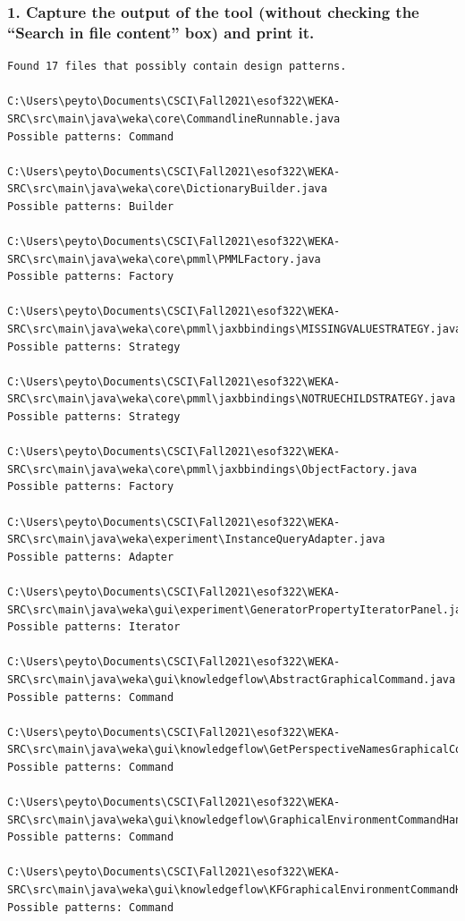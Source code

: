 \documentclass[12pt]{article}
\begin{document}
\subsubsection*{1. Capture the output of the tool (without checking the “Search in file content” box) and print it.}
\begin{lstlisting}
Found 17 files that possibly contain design patterns.

C:\Users\peyto\Documents\CSCI\Fall2021\esof322\WEKA-SRC\src\main\java\weka\core\CommandlineRunnable.java
Possible patterns: Command

C:\Users\peyto\Documents\CSCI\Fall2021\esof322\WEKA-SRC\src\main\java\weka\core\DictionaryBuilder.java
Possible patterns: Builder

C:\Users\peyto\Documents\CSCI\Fall2021\esof322\WEKA-SRC\src\main\java\weka\core\pmml\PMMLFactory.java
Possible patterns: Factory

C:\Users\peyto\Documents\CSCI\Fall2021\esof322\WEKA-SRC\src\main\java\weka\core\pmml\jaxbbindings\MISSINGVALUESTRATEGY.java
Possible patterns: Strategy

C:\Users\peyto\Documents\CSCI\Fall2021\esof322\WEKA-SRC\src\main\java\weka\core\pmml\jaxbbindings\NOTRUECHILDSTRATEGY.java
Possible patterns: Strategy

C:\Users\peyto\Documents\CSCI\Fall2021\esof322\WEKA-SRC\src\main\java\weka\core\pmml\jaxbbindings\ObjectFactory.java
Possible patterns: Factory

C:\Users\peyto\Documents\CSCI\Fall2021\esof322\WEKA-SRC\src\main\java\weka\experiment\InstanceQueryAdapter.java
Possible patterns: Adapter

C:\Users\peyto\Documents\CSCI\Fall2021\esof322\WEKA-SRC\src\main\java\weka\gui\experiment\GeneratorPropertyIteratorPanel.java
Possible patterns: Iterator

C:\Users\peyto\Documents\CSCI\Fall2021\esof322\WEKA-SRC\src\main\java\weka\gui\knowledgeflow\AbstractGraphicalCommand.java
Possible patterns: Command

C:\Users\peyto\Documents\CSCI\Fall2021\esof322\WEKA-SRC\src\main\java\weka\gui\knowledgeflow\GetPerspectiveNamesGraphicalCommand.java
Possible patterns: Command

C:\Users\peyto\Documents\CSCI\Fall2021\esof322\WEKA-SRC\src\main\java\weka\gui\knowledgeflow\GraphicalEnvironmentCommandHandler.java
Possible patterns: Command

C:\Users\peyto\Documents\CSCI\Fall2021\esof322\WEKA-SRC\src\main\java\weka\gui\knowledgeflow\KFGraphicalEnvironmentCommandHandler.java
Possible patterns: Command


\end{lstlisting}
\end{document}
